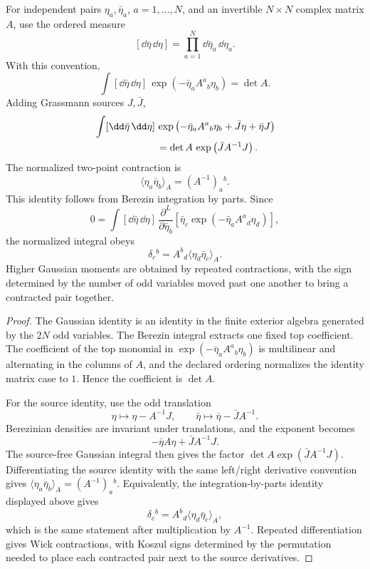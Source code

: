 \begin{lemma}
\label{lem:finite-berezin-gaussian-contractions}
For independent pairs \(\eta_a,\bar\eta_a\), \(a=1,\ldots,N\), and an
invertible \(N\times N\) complex matrix \(A\), use the ordered measure
\[
  [\dd\bar\eta\,\dd\eta]
  =
  \prod_{a=1}^N\dd\bar\eta_a\,\dd\eta_a .
\]
With this convention,
\[
  \int[\dd\bar\eta\,\dd\eta]\,
  \exp\left(-\bar\eta_a A^a{}_b\eta_b\right)
  =
  \det A .
\]
Adding Grassmann sources \(J,\bar J\),
\[
\begin{aligned}
  &\int[\dd\bar\eta\,\dd\eta]\,
  \exp\left(
    -\bar\eta_a A^a{}_b\eta_b
    +\bar J\eta+\bar\eta J
  \right)  \\
  &\hspace{2.2cm}
  =
  \det A\,
  \exp\left(\bar J A^{-1}J\right).
\end{aligned}
\]
The normalized two-point contraction is
\[
  \langle\eta_a\bar\eta_b\rangle_A
  =
  (A^{-1})_a{}^b .
\]
This identity follows from Berezin integration by parts. Since
\[
  0=
  \int[\dd\bar\eta\,\dd\eta]\,
  \frac{\partial^L}{\partial\bar\eta_b}
  \left[
    \bar\eta_c
    \exp\!\left(-\bar\eta_aA^a{}_d\eta_d\right)
  \right],
\]
the normalized integral obeys
\[
  \delta_c{}^b
  =
  A^b{}_d
  \langle\eta_d\bar\eta_c\rangle_A .
\]
Higher Gaussian moments are obtained by repeated contractions, with the sign
determined by the number of odd variables moved past one another to bring a
contracted pair together.
\end{lemma}

\begin{proof}
The Gaussian identity is an identity in the finite exterior algebra generated
by the \(2N\) odd variables.  The Berezin integral extracts one fixed top
coefficient.  The coefficient of the top monomial in
\(\exp(-\bar\eta_a A^a{}_b\eta_b)\) is multilinear and alternating in the
columns of \(A\), and the declared ordering normalizes the identity matrix
case to \(1\).  Hence the coefficient is \(\det A\).

For the source identity, use the odd translation
\[
  \eta\mapsto \eta-A^{-1}J,
  \qquad
  \bar\eta\mapsto \bar\eta-\bar J A^{-1}.
\]
Berezinian densities are invariant under translations, and the exponent
becomes
\[
  -\bar\eta A\eta+\bar J A^{-1}J .
\]
The source-free Gaussian integral then gives the factor
\(\det A\exp(\bar J A^{-1}J)\).  Differentiating the source identity with the
same left/right derivative convention gives
\(\langle\eta_a\bar\eta_b\rangle_A=(A^{-1})_a{}^b\). Equivalently, the
integration-by-parts identity displayed above gives
\[
  \delta_c{}^b=A^b{}_d\langle\eta_d\bar\eta_c\rangle_A ,
\]
which is the same statement after multiplication by \(A^{-1}\). Repeated
differentiation gives Wick contractions, with Koszul signs determined by the
permutation needed to place each contracted pair next to the source
derivatives.
\end{proof}

